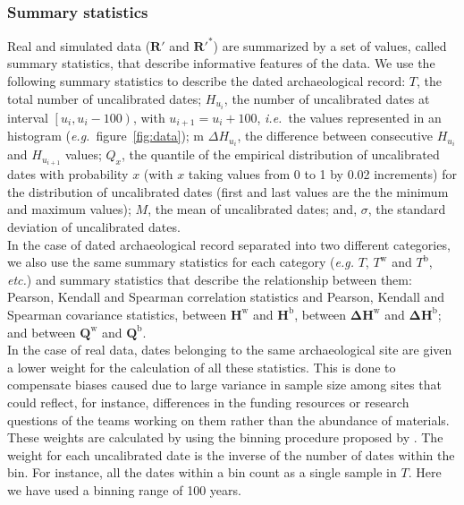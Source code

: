 \documentclass[a4paper]{article}
\begin{document}
\subsubsection*{Summary statistics}

Real and simulated data ($\bm{R}'$ and $\bm{R}'^*$) are summarized by a set of values, called summary statistics, that describe informative features of the data. We use the following summary statistics to describe the dated archaeological record: $T$, the total number of uncalibrated dates; $H_{u_i}$, the number of uncalibrated dates at interval $\left[u_i, u_i-100\right) $, with $u_{i+1}=u_i+100$, \emph{i.e.}\ the values represented in an histogram (\emph{e.g.}\ figure~\ref{fig:data}); m $\Delta H_{u_i}$, the difference between consecutive $H_{u_i}$ and $H_{u_{i+1}}$ values; $Q_x$, the quantile of the empirical distribution of uncalibrated dates with probability $x$ (with $x$ taking values from 0 to 1 by 0.02 increments) for the distribution of uncalibrated dates (first and last values are the the minimum and maximum values); $M$, the mean of uncalibrated dates; and, $\sigma$, the standard deviation of uncalibrated dates.
\\

In the case of dated archaeological record separated into two different categories, we also use the same summary statistics for each category (\emph{e.g.} $T$, $T^\mathrm{w}$ and $T^\mathrm{b}$, \emph{etc.}) and summary statistics that describe the relationship between them: Pearson, Kendall and Spearman correlation statistics and Pearson, Kendall and Spearman covariance statistics, between $\bm{H}^\mathrm{w}$ and $\bm{H}^\mathrm{b}$, between $\bm{\Delta H}^\mathrm{w}$ and $\bm{\Delta H}^\mathrm{b}$; and between $\bm{Q}^\mathrm{w}$ and $\bm{Q}^\mathrm{b}$.
\\

In the case of real data, dates belonging to the same archaeological site are given a lower weight for the calculation of all these statistics. This is done to compensate biases caused due to large variance in sample size among sites that could reflect, for instance, differences in the funding resources or research questions of the teams working on them rather than the abundance of materials. These weights are calculated by using the binning procedure proposed by \textcite{Shennan2013}. The weight for each uncalibrated date is the inverse of the number of dates within the bin. For instance, all the dates within a bin count as a single sample in $T$. Here we have used a binning range of 100 years.
\\
\end{document}
